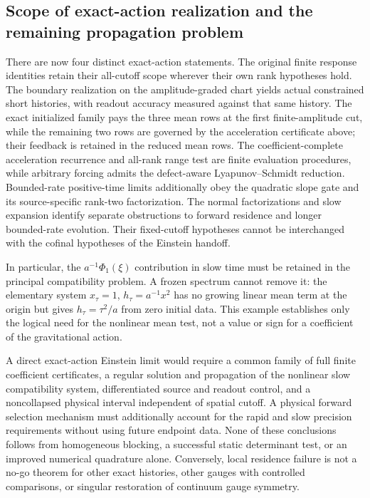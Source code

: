 \documentclass[11pt]{article}
\numberwithin{equation}{section}
\theoremstyle{definition}
\theoremstyle{remark}
\begin{document}
\subsection{Scope of exact-action realization and the remaining propagation problem}

There are now four distinct exact-action statements. The original finite
response identities retain their all-cutoff scope wherever their own rank
hypotheses hold. The boundary realization on the amplitude-graded chart
yields actual constrained short histories, with readout accuracy measured
against that same history.  The exact initialized family pays the three mean rows at the first
finite-amplitude cut, while the remaining two rows are governed by the
acceleration certificate above; their feedback is retained in the reduced
mean rows.  The coefficient-complete acceleration recurrence and all-rank
range test are finite evaluation procedures, while arbitrary forcing admits
the defect-aware Lyapunov--Schmidt reduction.  Bounded-rate positive-time limits additionally
obey the quadratic slope gate and its source-specific rank-two factorization.
The normal factorizations and slow expansion identify separate obstructions
to forward residence and longer bounded-rate evolution. Their fixed-cutoff hypotheses cannot be interchanged with the
cofinal hypotheses of the Einstein handoff.

In particular, the $a^{-1}\Phi_1(\xi)$ contribution in slow time must be
retained in the principal compatibility problem. A frozen spectrum cannot
remove it: the elementary system $x_\tau=1$,
$h_\tau=a^{-1}x^2$ has no growing linear mean term at the origin but gives
$h_\tau=\tau^2/a$ from zero initial data. This example establishes only the
logical need for the nonlinear mean test, not a value or sign for a
coefficient of the gravitational action.

A direct exact-action Einstein limit would require a common family of full
finite coefficient certificates, a regular solution and propagation of the
nonlinear slow compatibility system, differentiated source and readout
control, and a noncollapsed physical interval independent of spatial
cutoff. A physical forward selection mechanism must additionally account
for the rapid and slow precision requirements without using future
endpoint data. None of these conclusions follows from homogeneous
blocking, a successful static determinant test, or an improved numerical
quadrature alone. Conversely, local residence failure is not a no-go theorem
for other exact histories, other gauges with controlled comparisons, or
singular restoration of continuum gauge symmetry.
\end{document}
